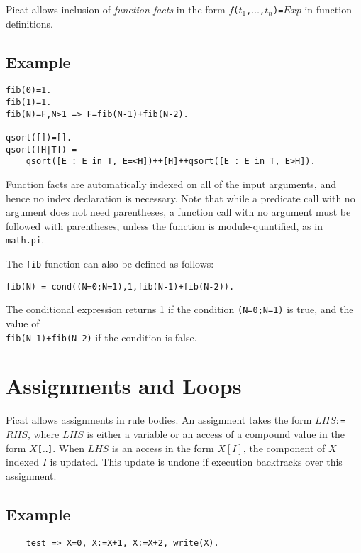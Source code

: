 Picat allows inclusion of \emph{function facts} in the form {\tt $f$($t_1$,$\ldots$,$t_n$)\verb+=+$Exp$} in function definitions. 

\subsection*{Example}
\begin{verbatim}
fib(0)=1.    
fib(1)=1.
fib(N)=F,N>1 => F=fib(N-1)+fib(N-2).

qsort([])=[].
qsort([H|T]) =
    qsort([E : E in T, E=<H])++[H]++qsort([E : E in T, E>H]).
\end{verbatim}
Function facts are automatically indexed on all of the input arguments, and hence no index declaration is necessary. Note that while a predicate call with no argument does not need parentheses, a function call with no argument must be followed with parentheses, unless the function is module-quantified, as in \texttt{math.pi}.

The \texttt{fib} function can also be defined as follows:
\begin{verbatim}
fib(N) = cond((N=0;N=1),1,fib(N-1)+fib(N-2)).
\end{verbatim}
The conditional expression returns 1 if the condition \texttt{(N=0;N=1)} is true, and the value of \\ \texttt{fib(N-1)+fib(N-2)} if the condition is false.

\section{Assignments and Loops}
Picat allows assignments in rule bodies. An assignment takes the form $LHS $$:$\verb+=+$ RHS$, where $LHS$ is either a variable or an access of a compound value in the form \texttt{$X$[\ldots]}. When $LHS$ is an access in the form $X[I]$, the component of $X$ indexed $I$ is updated. This update is undone if execution backtracks over this assignment.

\subsection*{Example}
\begin{verbatim}
    test => X=0, X:=X+1, X:=X+2, write(X).
\end{verbatim}

